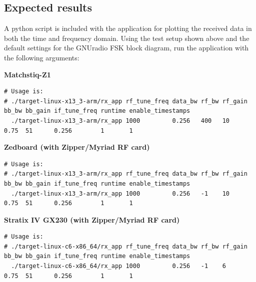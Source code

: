 \documentclass{article}
\begin{document}
\subsection{Expected results}
\noindent A python script is included with the application for plotting the received data in both the time and frequency domain. Using the test setup shown above and the default settings for the GNUradio FSK block diagram, run the application with the following arguments:\par\medskip
\noindent\textbf{Matchstiq-Z1}\\
\scriptsize
\begin{verbatim}
# Usage is:
# ./target-linux-x13_3-arm/rx_app rf_tune_freq data_bw rf_bw rf_gain bb_bw bb_gain if_tune_freq runtime enable_timestamps
  ./target-linux-x13_3-arm/rx_app 1000         0.256   400   10      0.75  51      0.256        1       1
\end{verbatim}
\par\medskip
\small

\noindent\textbf{Zedboard (with Zipper/Myriad RF card)}\\

\scriptsize
\begin{verbatim}
# Usage is:
# ./target-linux-x13_3-arm/rx_app rf_tune_freq data_bw rf_bw rf_gain bb_bw bb_gain if_tune_freq runtime enable_timestamps
  ./target-linux-x13_3-arm/rx_app 1000         0.256   -1    10      0.75  51      0.256        1       1
\end{verbatim}
\par\medskip
\small

\noindent\textbf{Stratix IV GX230 (with Zipper/Myriad RF card)}\\
\scriptsize
\noindent
\begin{verbatim}
# Usage is:
# ./target-linux-c6-x86_64/rx_app rf_tune_freq data_bw rf_bw rf_gain bb_bw bb_gain if_tune_freq runtime enable_timestamps
  ./target-linux-c6-x86_64/rx_app 1000         0.256   -1    6       0.75  51      0.256        1       1
\end{verbatim}
\small
\end{document}
